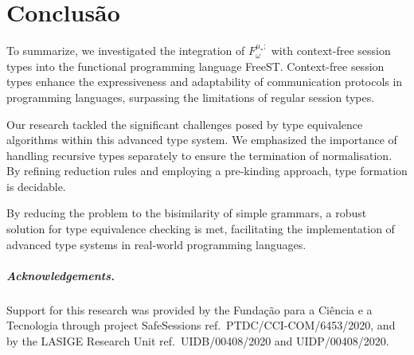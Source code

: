 
\chapter{Conclusão}




To summarize, we investigated the integration of  $F^{\mu_*;}_\omega$ with context-free session types into the functional programming language FreeST. Context-free session types enhance the expressiveness and adaptability of communication protocols in programming languages, surpassing the limitations of regular session types. 

Our research tackled the significant challenges posed by type equivalence algorithms within this advanced type system. We emphasized the importance of handling recursive types separately to ensure the termination of normalisation. By refining reduction rules and employing a pre-kinding approach, type formation is decidable.

By reducing the problem to the bisimilarity of simple grammars, a robust solution for type equivalence checking is met, facilitating the implementation of advanced type systems in real-world programming languages.
\medskip

\paragraph{Acknowledgements.}
  Support for this research was provided by the Fundação para a Ciência e a
  Tecnologia through project SafeSessions ref.\ PTDC/CCI-COM/6453/2020, and by the
  LASIGE Research Unit ref.\ UIDB/00408/2020
  and UIDP/00408/2020.
